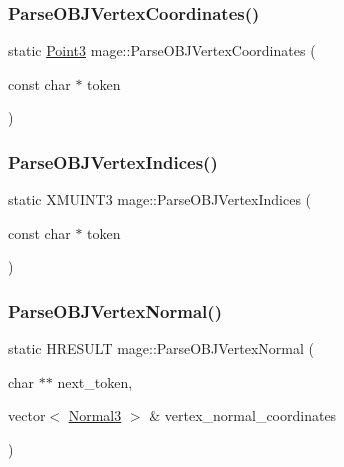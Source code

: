 \subsubsection{\texorpdfstring{Parse\+O\+B\+J\+Vertex\+Coordinates()}{ParseOBJVertexCoordinates()}}
{\footnotesize\ttfamily static \hyperlink{structmage_1_1_point3}{Point3} mage\+::\+Parse\+O\+B\+J\+Vertex\+Coordinates (\begin{DoxyParamCaption}\item[{const char $\ast$}]{token }\end{DoxyParamCaption})\hspace{0.3cm}{\ttfamily [static]}}

\hypertarget{namespacemage_afe94a043cb3be4de3549098b7ad7a326}{}\label{namespacemage_afe94a043cb3be4de3549098b7ad7a326} 
\subsubsection{\texorpdfstring{Parse\+O\+B\+J\+Vertex\+Indices()}{ParseOBJVertexIndices()}}
{\footnotesize\ttfamily static X\+M\+U\+I\+N\+T3 mage\+::\+Parse\+O\+B\+J\+Vertex\+Indices (\begin{DoxyParamCaption}\item[{const char $\ast$}]{token }\end{DoxyParamCaption})\hspace{0.3cm}{\ttfamily [static]}}

\hypertarget{namespacemage_a7fafd0a6eb151bf7a6473603f096adb8}{}\label{namespacemage_a7fafd0a6eb151bf7a6473603f096adb8} 
\subsubsection{\texorpdfstring{Parse\+O\+B\+J\+Vertex\+Normal()}{ParseOBJVertexNormal()}}
{\footnotesize\ttfamily static H\+R\+E\+S\+U\+LT mage\+::\+Parse\+O\+B\+J\+Vertex\+Normal (\begin{DoxyParamCaption}\item[{char $\ast$$\ast$}]{next\+\_\+token,  }\item[{vector$<$ \hyperlink{structmage_1_1_normal3}{Normal3} $>$ \&}]{vertex\+\_\+normal\+\_\+coordinates }\end{DoxyParamCaption})\hspace{0.3cm}{\ttfamily [static]}}

